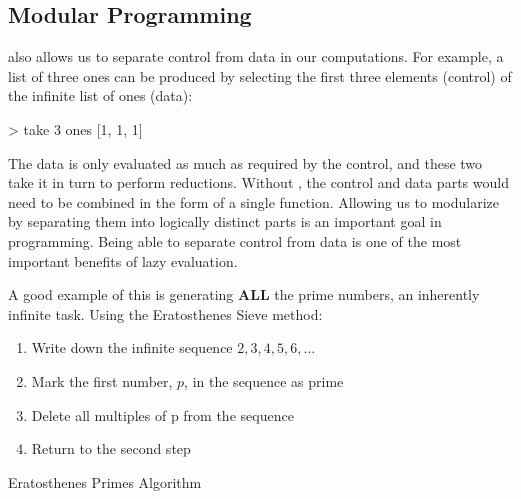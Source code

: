 \subsection{Modular Programming}\label{subsec:Modular_Programming}
 also allows us to separate control from data in our computations.
For example, a list of three ones can be produced by selecting the first three elements (control) of the infinite list of ones (data):
\begin{haskellsource}
> take 3 ones
[1, 1, 1]
\end{haskellsource}

The data is only evaluated as much as required by the control, and these two take it in turn to perform reductions.
Without , the control and data parts would need to be combined in the form of a single function.
Allowing us to modularize by separating them into logically distinct parts is an important goal in programming.
Being able to separate control from data is one of the most important benefits of lazy evaluation.

A good example of this is generating \textbf{ALL} the prime numbers, an inherently infinite task.
Using the Eratosthenes Sieve method:
\begin{enumerate}[noitemsep]
\item Write down the infinite sequence $2, 3, 4, 5, 6, \ldots$
\item Mark the first number, $p$, in the sequence as prime
\item Delete all multiples of p from the sequence
\item Return to the second step
\end{enumerate}

\begin{listing}[h!tbp]
\caption{Eratosthenes Primes Algorithm}
\label{lst:Eratosthenes_Primes}
\end{listing}


